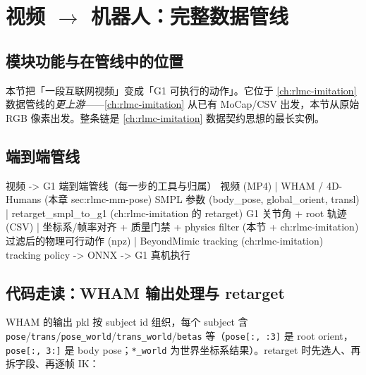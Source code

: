 \section{\texorpdfstring{视频 $\to$ 机器人：完整数据管线}{视频到机器人：完整数据管线}}
\label{sec:rlmc-mm-video}

\subsection{模块功能与在管线中的位置}
\label{sec:rlmc-mm-video-pos}

本节把「一段互联网视频」变成「G1 可执行的动作」。它位于 \cref{ch:rlmc-imitation} 数据管线的\emph{更上游}——\cref{ch:rlmc-imitation} 从已有 MoCap/CSV 出发，本节从原始 RGB 像素出发。整条链是 \cref{ch:rlmc-imitation} 数据契约思想的最长实例。

\subsection{端到端管线}
\label{sec:rlmc-mm-video-pipeline}

\begin{codebox}{视频 -> G1 端到端管线（每一步的工具与归属）}
视频 (MP4)
  | WHAM / 4D-Humans                         (本章 sec:rlmc-mm-pose)
SMPL 参数 (body_pose, global_orient, transl)
  | retarget_smpl_to_g1                       (ch:rlmc-imitation 的 retarget)
G1 关节角 + root 轨迹 (CSV)
  | 坐标系/帧率对齐 + 质量门禁 + physics filter  (本节 + ch:rlmc-imitation)
过滤后的物理可行动作 (npz)
  | BeyondMimic tracking                      (ch:rlmc-imitation)
tracking policy -> ONNX -> G1 真机执行
\end{codebox}

\subsection{代码走读：WHAM 输出处理与 retarget}
\label{sec:rlmc-mm-video-retarget}

WHAM 的输出 pkl 按 subject id 组织，每个 subject 含 \verb|pose|/\verb|trans|/\verb|pose_world|/\verb|trans_world|/\verb|betas| 等（\verb|pose[:, :3]| 是 root orient，\verb|pose[:, 3:]| 是 body pose；\verb|*_world| 为世界坐标系结果）。retarget 时先选人、再拆字段、再逐帧 IK：

